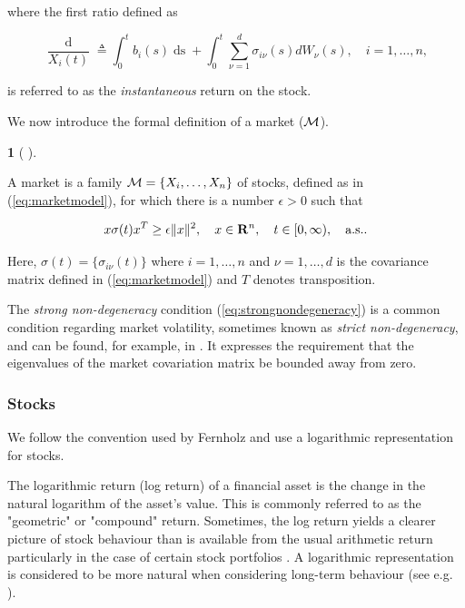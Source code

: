\documentclass[british]{amsart} \usepackage{lmodern}
\numberwithin{equation}{section} \numberwithin{figure}{section}
\theoremstyle{plain} \newtheorem{thm}{\protect\theoremname}[section]
\theoremstyle{definition} \newtheorem{defn}[thm]{\protect\definitionname}
\theoremstyle{plain} \newtheorem{assumption}[thm]{\protect\assumptionname}
\theoremstyle{plain} \newtheorem{lem}[thm]{\protect\lemmaname}
\theoremstyle{plain} \newtheorem{prop}[thm]{\protect\propositionname}
\theoremstyle{remark} \newtheorem{rem}[thm]{\protect\remarkname}
\theoremstyle{plain} \newtheorem{cor}[thm]{\protect\corollaryname}
\renewcommand{\d}[1]{\mathop{\mathrm{d}{#1}}}
\newcommand{\defeq}{\mathop{\triangleq}} \newcommand{\almostsurely}{\text{a.s.}}
\newcommand{\rangei}{i=1,\dots,n} \newcommand{\measure}{\mathbb{P}}
\begin{document}
where the first ratio defined as

\begin{equation*}
  \frac{\d{X_{i}(t)}}{X_{i}(t)} \defeq 
  \int_{0}^{t} b_{i}(s)\d{s} + 
  \int_{0}^{t} \sum_{\nu=1}^{d} \sigma_{i\nu}(s) dW_{\nu}(s),
  \quad \rangei,
\end{equation*}

is referred to as the \textit{instantaneous} return on the stock.

We now introduce the formal definition of a market ($\mathcal{M}$).

\begin{defn} 
[
  {\cite[Definition 2.2]{fernholz1999pgf}}
]
\label{def:market}

A market is a family $\mathcal{M} = \{X_{i},\dots,X_{n}\}$ of stocks, defined as in
(\ref{eq:marketmodel}), for which there is a number $\epsilon>0$ such that

\begin{equation}
  \label{eq:strongnondegeneracy}
  x \sigma(t) x^{T} \ge \epsilon \|x\|^{2}, 
  \quad x \in \mathbf{R}^{n}, 
  \quad \ranget,
  \quad \almostsurely.
\end{equation}

Here, $\sigma(t) = \{\sigma_{i\nu}(t)\}$ where $\rangei$ and $\nu=1,\dots,d$ is the
covariance matrix defined in (\ref{eq:marketmodel}) and $T$ denotes
transposition.

\end{defn}

The \textit{strong non-degeneracy} condition (\ref{eq:strongnondegeneracy}) is a 
common condition regarding market volatility, sometimes known as \textit{strict
non-degeneracy}, and can be found, for example, in \cite{shreve1991}. It 
expresses the requirement that the eigenvalues of the market covariation 
matrix be bounded away from zero. 

\subsubsection{Stocks}

We follow the convention used by Fernholz and use a logarithmic representation
for stocks.

The logarithmic return (log return) of a financial asset is the change in the
natural logarithm of the asset's value. This is commonly referred to as the
"geometric" or "compound" return. Sometimes, the log return yields a clearer
picture of stock behaviour than is available from the usual arithmetic return
particularly in the case of certain stock portfolios
\cite{fernholz2007statistics}. A logarithmic representation is considered to be
more natural when considering long-term behaviour (see e.g.
\cite{fernholz1982}).
\end{document}
